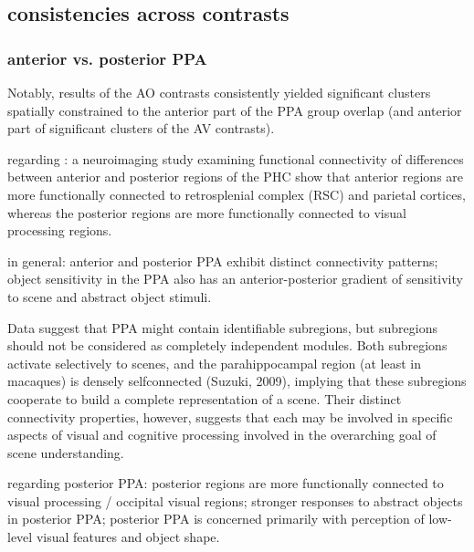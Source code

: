 \documentclass[english]{article}
\begin{document}
\subsection{consistencies across contrasts}

\subsubsection{anterior vs. posterior PPA}

Notably, results of the AO contrasts consistently yielded significant clusters
spatially constrained to the anterior part of the PPA group overlap (and
anterior part of significant clusters of the AV contrasts).


\citep{aminoff2013role} regarding \citep{baldassano2013differential}: a
neuroimaging study examining functional connectivity of differences between
anterior and posterior regions of the PHC show that anterior regions are more
functionally connected to retrosplenial complex (RSC) and parietal cortices,
whereas the posterior regions are more functionally connected to visual
processing regions.

\citep{baldassano2013differential} in general: anterior and posterior PPA
exhibit distinct connectivity patterns; object sensitivity in the PPA also has
an anterior-posterior gradient of sensitivity to scene and abstract object
stimuli.

Data suggest that PPA might contain identifiable subregions, but subregions
should not be considered as completely independent modules. Both subregions
activate selectively to scenes, and the parahippocampal region (at least in
macaques) is densely selfconnected (Suzuki, 2009), implying that these
subregions cooperate to build a complete representation of a scene.
%
Their distinct connectivity properties, however, suggests that each may be
involved in specific aspects of visual and cognitive processing involved in the
overarching goal of scene understanding.

\citep{baldassano2013differential} regarding posterior PPA: posterior regions
are more functionally connected to visual processing / occipital visual regions;
stronger responses to abstract objects in posterior PPA; posterior PPA is
concerned primarily with perception of low-level visual features and object
shape.
\end{document}
